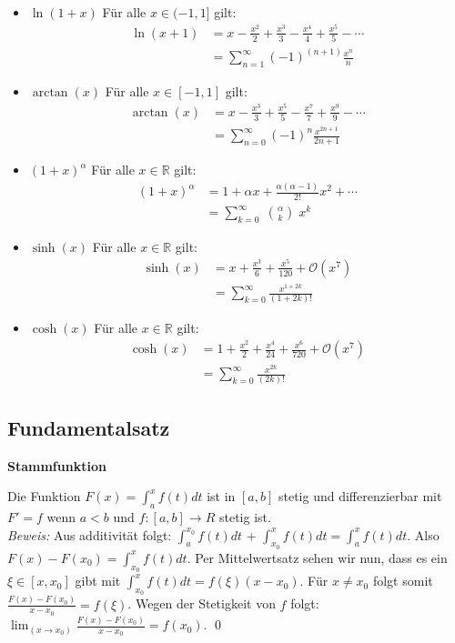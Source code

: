 \documentclass[25pt]{sciposter}
\newcommand{\R}{\mathbb{R}}
\newenvironment{method}[1]{\begin{mdframed}[backgroundcolor=blue!10,innertopmargin=15pt, innerbottommargin=15pt, nobreak=true]
		\textbf{#1 }
	}
	{ 
	\end{mdframed}
}
\begin{document}
\begin{multicols}{3}
\begin{itemize}
	\item $\boxed{\ln(1+x)}$ Für alle $x\in (-1,1]$ gilt:
	\begin{align*}
	\ln(x+1) &= x - \frac{x^2}{2} + \frac{x^3}{3} - \frac{x^4}{4} + \frac{x^5}{5}- \cdots \\
	&= \sum_{n=1}^{\infty} (-1)^{(n+1)} \frac{x^n}{n}
	\end{align*}

	\item $\boxed{\arctan(x)}$ Für alle $x\in [-1,1]$ gilt:
	\begin{align*}
	\arctan(x) &= x - \frac{x^3}{3} + \frac{x^5}{5} - \frac{x^7}{7} + \frac{x^9}{9} - \cdots \\
	&= \sum_{n=0}^{\infty} (-1)^n \frac{x^{2n+1}}{2n+1}
	\end{align*}

	\item $\boxed{(1 + x)^\alpha}$ Für alle $x\in \R$ gilt:
	\begin{align*}
	(1 + x)^\alpha &=  1 + \alpha x + \frac{\alpha(\alpha-1)}{2!} x^2 + \cdots \\
	 &= \sum_{k=0}^{\infty} \; {\alpha \choose k} \; x^k 
	\end{align*}
	
	\item $\boxed{\sinh(x)}$ Für alle $x\in \R$ gilt:
	\begin{align*}
	\sinh(x) &= x + \frac{x^3}{6} + \frac{x^5}{120} + \mathcal{O}(x^7)\\
	&= \sum_{k=0}^{\infty}\frac{x^{1+2k}}{(1+2k)!}
	\end{align*}
	
	\item $\boxed{\cosh(x)}$ Für alle $x\in \R$ gilt:
	\begin{align*}
	\cosh(x) &= 1 + \frac{x^2}{2} + \frac{x^4}{24} + \frac{x^6}{720} +  \mathcal{O}(x^7)\\
	&= \sum_{k=0}^{\infty}\frac{x^{2k}}{(2k)!}
	\end{align*}
	

\end{itemize}






\subsection*{Fundamentalsatz}
\begin{method}{Stammfunktion}
Die Funktion $F(x) = \int_{a}^{x} f(t) dt$ ist in $[a,b]$ stetig und differenzierbar mit $F' = f$ wenn $a<b$ und $f:[a,b]\to R$ stetig ist. \\
\textit{Beweis:} Aus additivität folgt: $\int_{a}^{x_0} f(t) dt$ + $\int_{x_0}^{x} f(t) dt = \int_{a}^{x} f(t) dt$. Also $F(x) - F(x_0) = \int_{x_0}^{x} f(t) dt$. Per Mittelwertsatz sehen wir nun, dass es ein $\xi \in [x,x_0]$ gibt mit $\int_{x_0}^{x} f(t) dt = f(\xi) (x-x_0) $. Für $x \not = x_0$ folgt somit $\frac{F(x) - F(x_0)}{x-x_0} = f(\xi)$. Wegen der Stetigkeit von $f$ folgt: $\lim_{(x\to x_0)} \frac{F(x) - F(x_0)}{x-x_0} = f(x_0)$. \qed
\end{method}



\end{multicols}
\end{document}
